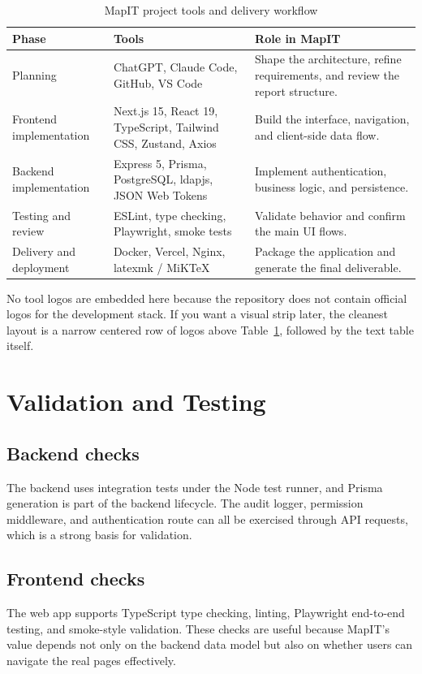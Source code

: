 \begin{table}[H]
\centering
\small
\renewcommand{\arraystretch}{1.12}
\begin{tabular}{|>{\raggedright\arraybackslash}p{2.6cm}|>{\raggedright\arraybackslash}p{4.2cm}|>{\raggedright\arraybackslash}p{6.2cm}|}
\hline
\textbf{Phase} & \textbf{Tools} & \textbf{Role in MapIT} \\ \hline
Planning & ChatGPT, Claude Code, GitHub, VS Code & Shape the architecture, refine requirements, and review the report structure. \\ \hline
Frontend implementation & Next.js 15, React 19, TypeScript, Tailwind CSS, Zustand, Axios & Build the interface, navigation, and client-side data flow. \\ \hline
Backend implementation & Express 5, Prisma, PostgreSQL, ldapjs, JSON Web Tokens & Implement authentication, business logic, and persistence. \\ \hline
Testing and review & ESLint, type checking, Playwright, smoke tests & Validate behavior and confirm the main UI flows. \\ \hline
Delivery and deployment & Docker, Vercel, Nginx, latexmk / MiKTeX & Package the application and generate the final deliverable. \\ \hline
\end{tabular}
\caption{MapIT project tools and delivery workflow}
\label{tab:mapit-tools-workflow}
\end{table}

No tool logos are embedded here because the repository does not contain official logos for the development stack. If you want a visual strip later, the cleanest layout is a narrow centered row of logos above Table~\ref{tab:mapit-tools-workflow}, followed by the text table itself.

\section{Validation and Testing}
\subsection{Backend checks}
The backend uses integration tests under the Node test runner, and Prisma generation is part of the backend lifecycle. The audit logger, permission middleware, and authentication route can all be exercised through API requests, which is a strong basis for validation.

\subsection{Frontend checks}
The web app supports TypeScript type checking, linting, Playwright end-to-end testing, and smoke-style validation. These checks are useful because MapIT’s value depends not only on the backend data model but also on whether users can navigate the real pages effectively.

